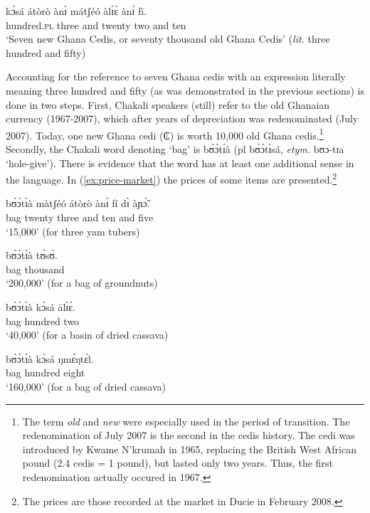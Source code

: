 \begin{exe}
\begin{exe}
\begin{exe}
\begin{exe}
\begin{exe}
\begin{exe}
\begin{exe}
\begin{exe}
\begin{exe}
\begin{exe}
\ea\label{ex:70000}
\gll kɔ̀sá átòrò ànɪ̀ mátʃéó àlɪ̀ɛ̀ ànɪ́ fī.\\
 hundred.\textsc{pl} three and twenty two and ten\\
\glt `Seven new Ghana Cedis, or seventy thousand old Ghana Cedis' ({\it lit.} three hundred and fifty)\\
\z 

Accounting for the reference to seven Ghana cedis with an expression literally meaning three hundred and fifty (as was demonstrated in the previous sections) is done in two steps.  First, Chakali speakers (still) refer to the old Ghanaian currency (1967-2007), which after years of depreciation was redenominated (July 2007). Today,  one new Ghana cedi ({\W ₵}) is worth 10,000 old Ghana cedis.\footnote{The term \textit{old} and \textit{new} were especially used in the period of transition. The redenomination of July 2007 is the second in the cedis history. The cedi was introduced by Kwame N'krumah in 1965, replacing the British West African pound (2.4 cedis = 1 pound), but lasted only two years. Thus,  the first redenomination actually occured in 1967.}  Secondly, the Chakali word denoting `bag'  is  {\sls bʊ̀ɔ̀tɪ́à} ({\sc pl} {\sls  bʊ̀ɔ̀tɪ̀sá},  \textit{etym.}  {\sls bʊɔ-tɪa} `hole-give').  There is evidence that the word has at least one additional sense in the language. In (\ref{ex:price-market}) the prices of some items are presented.\footnote{The prices are those recorded at the market in Ducie in February 2008.}



\ea\label{ex:price-market}

\ea\label{ex:yamtubers}
\gll bʊ̀ɔ̀tɪ̀à màtʃéó  átòrò ànɪ́ fí dɪ̀  àɲɔ̃́.\\
bag twenty three and ten and five\\
\glt `15,000' (for  three yam tubers)




\ex\label{ex:groundnutbag}
\gll bʊ̀ɔ̀tɪ̀à tʊ́sʊ̀.\\
bag thousand\\
\glt `200,000' (for a bag of groundnuts)


\ex\label{ex:driedcassava}
\gll bʊ̀ɔ̀tɪ̀à kɔ̀sá ālɪ̀ɛ̀.\\
bag hundred two\\
\glt `40,000' (for a basin of dried cassava)


\ex\label{ex:cassavabag}
\gll bʊ̀ɔ̀tɪ̀à kɔ̀sá ŋmɛ́ŋtɛ́l.\\
bag hundred eight\\
\glt `160,000' (for a bag of dried cassava) 



\end{exe}
\end{exe}
\end{exe}
\end{exe}
\end{exe}
\end{exe}
\end{exe}
\end{exe}
\end{exe}
\end{exe}
